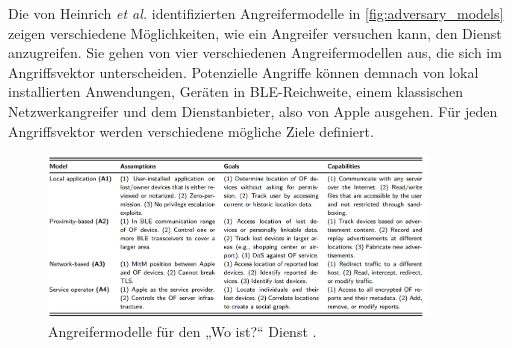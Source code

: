 Die von Heinrich \textit{et al.} \cite{Heinrich_FindMy} identifizierten Angreifermodelle in \autoref{fig:adversary_models} zeigen verschiedene Möglichkeiten, wie ein Angreifer versuchen kann, den Dienst anzugreifen.
Sie gehen von vier verschiedenen Angreifermodellen aus, die sich im Angriffsvektor unterscheiden.
Potenzielle Angriffe können demnach von lokal installierten Anwendungen, Geräten in \ac{BLE}-Reichweite, einem klassischen Netzwerkangreifer und dem Dienstanbieter, also von Apple ausgehen.
Für jeden Angriffsvektor werden verschiedene mögliche Ziele definiert.
\begin{figure}[ht]
  \centering
  \includegraphics[width=0.9\textwidth]{img/adversary_models}
  \caption{Angreifermodelle für den „Wo ist?“ Dienst \cite{Heinrich_FindMy}.}
  \label{fig:adversary_models}
\end{figure}

